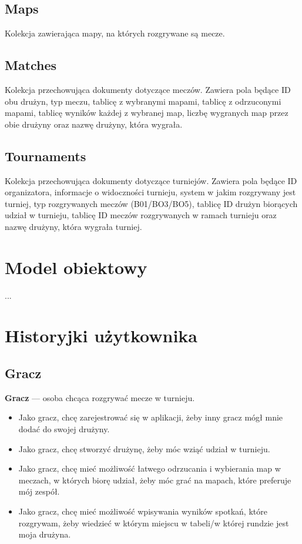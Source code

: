 \documentclass[shortabstract]{iithesis}
\theoremstyle{definition} \newtheorem{definition}{Definicja}[]
\theoremstyle{remark} \newtheorem{remark}[definition]{Observation}
\theoremstyle{plain} \newtheorem{theorem}[definition]{Theorem}
\theoremstyle{plain} \newtheorem{lemma}[definition]{Lemma}
\begin{document}
\subsection{Maps}
Kolekcja zawierająca mapy, na których rozgrywane są mecze.

\subsection{Matches}
Kolekcja przechowująca dokumenty dotyczące meczów. Zawiera pola będące ID obu drużyn, typ meczu, tablicę z wybranymi mapami, tablicę z odrzuconymi mapami, tablicę wyników każdej z wybranej map, liczbę wygranych map przez obie drużyny oraz nazwę drużyny, która wygrała.

\subsection{Tournaments}
Kolekcja przechowująca dokumenty dotyczące turniejów. Zawiera pola będące ID organizatora, informacje o widoczności turnieju, system w jakim rozgrywany jest turniej, typ rozgrywanych meczów (B01/BO3/BO5), tablicę ID drużyn biorących udział w turnieju, tablicę ID meczów rozgrywanych w ramach turnieju oraz nazwę drużyny, która wygrała turniej.

\section{Model obiektowy} %
...

\section{Historyjki użytkownika}

\subsection{Gracz}
\textbf{Gracz} --- osoba chcąca rozgrywać mecze w turnieju.
\begin{itemize}
    \item Jako gracz, chcę zarejestrować się w aplikacji, żeby inny gracz mógł mnie dodać do swojej drużyny.
    \item Jako gracz, chcę stworzyć drużynę, żeby móc wziąć udział w turnieju.
    \item Jako gracz, chcę mieć możliwość łatwego odrzucania i wybierania map w meczach, w których biorę udział, żeby móc grać na mapach, które preferuje mój zespół.
    \item Jako gracz, chcę mieć możliwość wpisywania wyników spotkań, które rozgrywam, żeby wiedzieć w którym miejscu w tabeli/w której rundzie jest moja drużyna.
\end{itemize}
\end{document}
